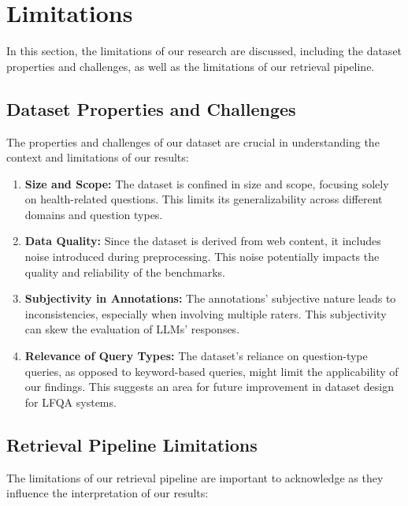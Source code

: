 \chapter{Limitations}\label{limitations}
In this section, the limitations of our research are discussed, including the dataset properties and challenges, as well as the limitations of our retrieval pipeline.

\section{Dataset Properties and Challenges}

The properties and challenges of our dataset are crucial in understanding the context and limitations of our results:

\begin{enumerate}
    \item \textbf{Size and Scope:} The dataset is confined in size and scope, focusing solely on health-related questions. This limits its generalizability across different domains and question types.
    \item \textbf{Data Quality:} Since the dataset is derived from web content, it includes noise introduced during preprocessing. This noise potentially impacts the quality and reliability of the benchmarks.
    \item \textbf{Subjectivity in Annotations:} The annotations' subjective nature leads to inconsistencies, especially when involving multiple raters. This subjectivity can skew the evaluation of LLMs' responses.
    \item \textbf{Relevance of Query Types:} The dataset's reliance on question-type queries, as opposed to keyword-based queries, might limit the applicability of our findings. This suggests an area for future improvement in dataset design for LFQA systems.
\end{enumerate}

\section{Retrieval Pipeline Limitations}

The limitations of our retrieval pipeline are important to acknowledge as they influence the interpretation of our results:

